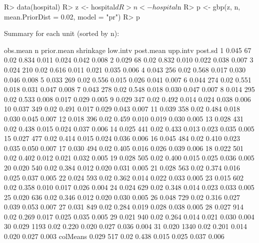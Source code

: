 \documentclass[article]{jss}
\begin{document}
\begin{CodeChunk}
\begin{CodeInput}
R> data(hospital)
R> z <- hospital$d
R> n <- hospital$n
R> p <- gbp(z, n, mean.PriorDist = 0.02, model = "pr")
R> p
\end{CodeInput}
\begin{CodeOutput}
Summary for each unit (sorted by n):

         obs.mean    n prior.mean shrinkage low.intv post.mean upp.intv post.sd
1           0.045   67       0.02     0.834    0.011     0.024    0.042   0.008
2           0.029   68       0.02     0.832    0.010     0.022    0.038   0.007
3           0.024  210       0.02     0.616    0.011     0.021    0.035   0.006
4           0.043  256       0.02     0.568    0.017     0.030    0.046   0.008
5           0.033  269       0.02     0.556    0.015     0.026    0.041   0.007
6           0.044  274       0.02     0.551    0.018     0.031    0.047   0.008
7           0.043  278       0.02     0.548    0.018     0.030    0.047   0.007
8           0.014  295       0.02     0.533    0.008     0.017    0.029   0.005
9           0.029  347       0.02     0.492    0.014     0.024    0.038   0.006
10          0.037  349       0.02     0.491    0.017     0.029    0.043   0.007
11          0.039  358       0.02     0.484    0.018     0.030    0.045   0.007
12          0.018  396       0.02     0.459    0.010     0.019    0.030   0.005
13          0.028  431       0.02     0.438    0.015     0.024    0.037   0.006
14          0.025  441       0.02     0.433    0.013     0.023    0.035   0.005
15          0.027  477       0.02     0.414    0.015     0.024    0.036   0.006
16          0.045  484       0.02     0.410    0.023     0.035    0.050   0.007
17          0.030  494       0.02     0.405    0.016     0.026    0.039   0.006
18          0.022  501       0.02     0.402    0.012     0.021    0.032   0.005
19          0.028  505       0.02     0.400    0.015     0.025    0.036   0.005
20          0.020  540       0.02     0.384    0.012     0.020    0.031   0.005
21          0.028  563       0.02     0.374    0.016     0.025    0.037   0.005
22          0.024  593       0.02     0.362    0.014     0.022    0.033   0.005
23          0.015  602       0.02     0.358    0.010     0.017    0.026   0.004
24          0.024  629       0.02     0.348    0.014     0.023    0.033   0.005
25          0.020  636       0.02     0.346    0.012     0.020    0.030   0.005
26          0.048  729       0.02     0.316    0.027     0.039    0.053   0.007
27          0.031  849       0.02     0.284    0.019     0.028    0.038   0.005
28          0.027  914       0.02     0.269    0.017     0.025    0.035   0.005
29          0.021  940       0.02     0.264    0.014     0.021    0.030   0.004
30          0.029 1193       0.02     0.220    0.020     0.027    0.036   0.004
31          0.020 1340       0.02     0.201    0.014     0.020    0.027   0.003
colMeans    0.029  517       0.02     0.438    0.015     0.025    0.037   0.006
\end{CodeOutput}
\end{CodeChunk}
\end{document}
